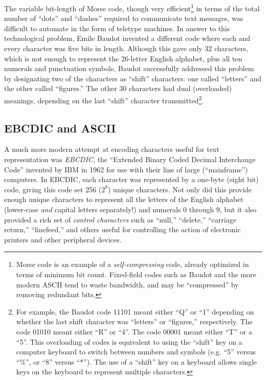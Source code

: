 The variable bit-length of Morse code, though very efficient\footnote{Morse code is an example of a \textit{self-compressing} code, already optimized in terms of minimum bit count.  Fixed-field codes such as Baudot and the more modern ASCII tend to waste bandwidth, and may be ``compressed'' by removing redundant bits.} in terms of the total number of ``dots'' and ``dashes'' required to communicate text messages, was difficult to automate in the form of teletype machines.  In answer to this technological problem, Emile Baudot invented a different code where each and every character was five bits in length.  Although this gave only 32 characters, which is not enough to represent the 26-letter English alphabet, plus all ten numerals and punctuation symbols, Baudot successfully addressed this problem by designating two of the characters as ``shift'' characters: one called ``letters'' and the other called ``figures.''  The other 30 characters had dual (overloaded) meanings, depending on the last ``shift'' character transmitted\footnote{For example, the Baudot code 11101 meant either ``Q'' or ``1'' depending on whether the last shift character was ``letters'' or ``figures,'' respectively.  The code 01010 meant either ``R'' or ``4''.  The code 00001 meant either ``T'' or a ``5''.  This overloading of codes is equivalent to using the ``shift'' key on a computer keyboard to switch between numbers and symbols (e.g. ``5'' versus ``\%'', or ``8'' versus ``*'').  The use of a ``shift'' key on a keyboard allows single keys on the keyboard to represent multiple characters.}.  





\filbreak
\subsection{EBCDIC and ASCII}

A much more modern attempt at encoding characters useful for text representation was \textit{EBCDIC}, the ``Extended Binary Coded Decimal Interchange Code'' invented by IBM in 1962 for use with their line of large (``mainframe'') computers.  In EBCDIC, each character was represented by a one-byte (eight bit) code, giving this code set 256 ($2^8$) unique characters.  Not only did this provide enough unique characters to represent all the letters of the English alphabet (lower-case \textit{and} capital letters separately!) and numerals 0 through 9, but it also provided a rich set of \textit{control characters} such as ``null,'' ``delete,'' ``carriage return,'' ``linefeed,'' and others useful for controlling the action of electronic printers and other peripheral devices.      


